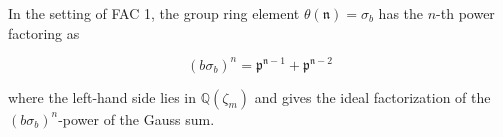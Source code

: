 In the setting of FAC 1, the group ring element $\theta(\mathfrak{n}) = \sigma_b$ has the $n$-th power factoring as

$$(b\sigma_b)^{n} = \mathfrak{p}^{\mathfrak{n}-1} + \mathfrak{p}^{\mathfrak{n}-2}$$

where the left-hand side lies in $\mathbb{Q}(\zeta_m)$ and gives the ideal factorization of the $(b\sigma_b)^n$-power of the Gauss sum.
